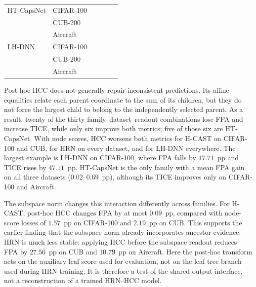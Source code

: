 \begin{table}[htbp]
\begin{tabularx}{\linewidth}{@{}L{1.7cm}L{1.7cm}|CC|CC@{}}
\midrule
HT-CapsNet & CIFAR-100 &  &  &  &  \\
           & CUB-200   &  &  &  &  \\
           & Aircraft  &  &  &  &  \\
\midrule
LH-DNN     & CIFAR-100 &  &  &  &  \\
           & CUB-200   &  &  &  &  \\
           & Aircraft  &  &  &  &  \\
\bottomrule
\end{tabularx}
\end{table}

Post-hoc HCC does not generally repair inconsistent predictions. Its affine
equalities relate each parent coordinate to the sum of its children, but they do
not force the largest child to belong to the independently selected parent. As a
result, twenty of the thirty family--dataset--readout combinations lose FPA and
increase TICE, while only six improve both metrics; five of those six are
HT-CapsNet. With node scores, HCC worsens both metrics for H-CAST on CIFAR-100
and CUB, for HRN on every dataset, and for LH-DNN everywhere. The largest example
is LH-DNN on CIFAR-100, where FPA falls by $17.71$~pp and TICE rises by
$47.11$~pp. HT-CapsNet is the only family with a mean FPA gain on all three
datasets ($0.02$--$0.69$~pp), although its TICE improves only on CIFAR-100 and
Aircraft.

The subspace norm changes this interaction differently across families. For
H-CAST, post-hoc HCC changes FPA by at most $0.09$~pp, compared with node-score
losses of $1.57$~pp on CIFAR-100 and $2.19$~pp on CUB. This supports the earlier
finding that the subspace norm already incorporates ancestor evidence. HRN is
much less stable: applying HCC before the subspace readout reduces FPA by
$27.56$~pp on CUB and $10.79$~pp on Aircraft. Here the post-hoc transform acts on
the auxiliary leaf score used for evaluation, not on the leaf tree branch used
during HRN training. It is therefore a test of the shared output interface, not
a reconstruction of a trained HRN--HCC model.

